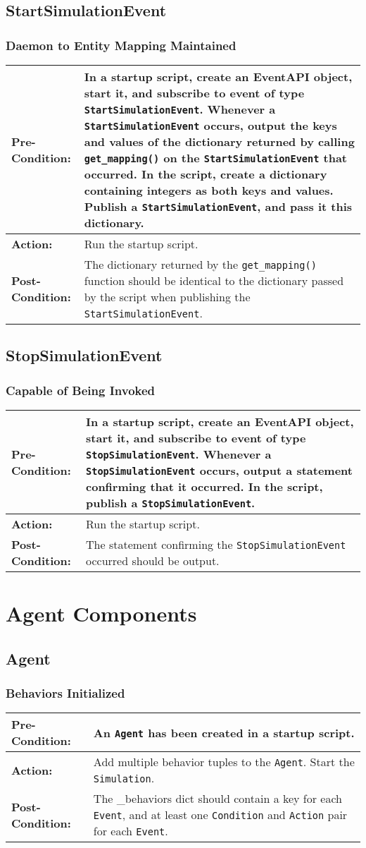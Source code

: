 \documentclass[titlepage]{article}
\newcommand{\testcase}[3]{
    \begin{center}
    \begin{tabular}{| l | p{0.7\textwidth}|}
        \hline
        \rowcolor[gray]{0.8}\textbf{Pre-Condition:} & #1 \\ \hline
        \textbf{Action:} & #2 \\ \hline
        \rowcolor[gray]{0.8}\textbf{Post-Condition:} & #3 \\ \hline
    \end{tabular}
    \end{center}
}
\begin{document}
\subsection{StartSimulationEvent}
\subsubsection{Daemon to Entity Mapping Maintained}
\testcase{In a startup script, create an EventAPI object, start it, and subscribe to event of type \texttt{StartSimulationEvent}. Whenever a \texttt{StartSimulationEvent} occurs, output the keys and values of the dictionary returned by calling \texttt{get\_mapping()} on the \texttt{StartSimulationEvent} that occurred. In the script, create a dictionary containing integers as both keys and values. Publish a \texttt{StartSimulationEvent}, and pass it this dictionary.}{Run the startup script.}{The dictionary returned by the \texttt{get\_mapping()} function should be identical to the dictionary passed by the script when publishing the \texttt{StartSimulationEvent}.}

\subsection{StopSimulationEvent}
\subsubsection{Capable of Being Invoked}
\testcase{In a startup script, create an EventAPI object, start it, and subscribe to event of type \texttt{StopSimulationEvent}. Whenever a \texttt{StopSimulationEvent} occurs, output a statement confirming that it occurred. In the script, publish a \texttt{StopSimulationEvent}.}{Run the startup script.}{The statement confirming the \texttt{StopSimulationEvent} occurred should be output.}


\section{Agent Components}
\subsection{Agent}
\subsubsection{Behaviors Initialized}
\testcase{An \texttt{Agent} has been created in a startup script.}{Add multiple behavior tuples to the \texttt{Agent}.
Start the \texttt{Simulation}.}{The \_behaviors dict should contain a key for each \texttt{Event}, and at least one 
\texttt{Condition} and \texttt{Action} pair for each \texttt{Event}.}
\end{document}
